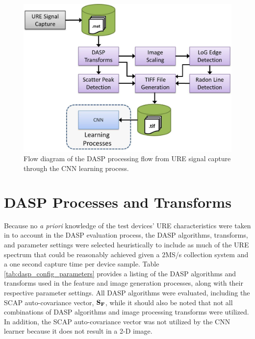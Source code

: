 \begin{figure}[tb]
	\includegraphics[width=\textwidth]{./misc_graphics/dasp_cnn_process_flow.jpg}
	\centering
	\caption{Flow diagram of the DASP processing flow from URE signal capture through the CNN learning process.}
	\label{fig:dasp_cnn_process_flow}
\end{figure}

\section[DASP Processes and Transforms]{DASP Processes and Transforms}

Because no \emph{a priori} knowledge of the test devices' URE characteristics were taken in to account in the DASP evaluation process, the DASP algorithms, transforms, and parameter settings were selected heuristically to include as much of the URE spectrum that could be reasonably achieved given a $2$MS/s collection system and a one second capture time per device sample.  Table \ref{tab:dasp_config_parameters} provides a listing of the DASP algorithms and transforms used in the feature and image generation processes, along with their respective parameter settings.  All DASP algorithms were evaluated, including the SCAP auto-covariance vector, $\bf{S}_F$, while it should also be noted that not all combinations of DASP algorithms and image processing transforms were utilized.  In addition, the SCAP auto-covariance vector was not utilized by the CNN learner because it does not result in a 2-D image. 

